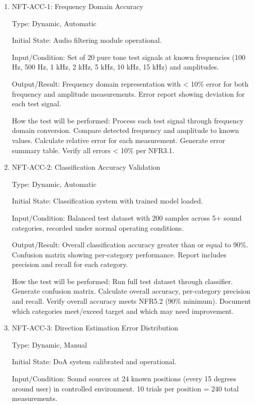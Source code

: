 \documentclass[12pt, titlepage]{article}
\begin{document}
\begin{enumerate}

\item{NFT-ACC-1: Frequency Domain Accuracy\\}

Type: Dynamic, Automatic

Initial State: Audio filtering module operational.

Input/Condition: Set of 20 pure tone test signals at known frequencies (100 Hz,
500 Hz, 1 kHz, 2 kHz, 5 kHz, 10 kHz, 15 kHz) and amplitudes.

Output/Result: Frequency domain representation with < 10\% error for both
frequency and amplitude measurements. Error report showing deviation for each
test signal.

How the test will be performed: Process each test signal through frequency domain
conversion. Compare detected frequency and amplitude to known values. Calculate
relative error for each measurement. Generate error summary table. Verify all
errors < 10\% per NFR3.1.

\item{NFT-ACC-2: Classification Accuracy Validation\\}

Type: Dynamic, Automatic

Initial State: Classification system with trained model loaded.

Input/Condition: Balanced test dataset with 200 samples across 5+ sound
categories, recorded under normal operating conditions.

Output/Result: Overall classification accuracy greater than or equal to 90\%. Confusion matrix showing
per-category performance. Report includes precision and recall for each
category.

How the test will be performed: Run full test dataset through classifier. Generate
confusion matrix. Calculate overall accuracy, per-category precision and recall.
Verify overall accuracy meets NFR5.2 (90\% minimum). Document which categories
meet/exceed target and which may need improvement.

\item{NFT-ACC-3: Direction Estimation Error Distribution\\}

Type: Dynamic, Manual

Initial State: DoA system calibrated and operational.

Input/Condition: Sound sources at 24 known positions (every 15 degrees around user) in
controlled environment. 10 trials per position = 240 total measurements.


\end{enumerate}
\end{document}
